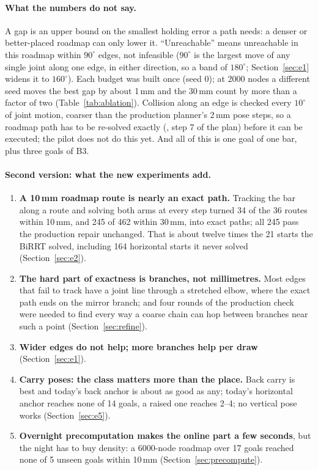 \paragraph{What the numbers do not say.}
A gap is an upper bound on the smallest holding error a path needs: a denser or
better-placed roadmap can only lower it. ``Unreachable'' means unreachable in
this roadmap within $90^\circ$ edges, not infeasible ($90^\circ$ is the
largest move of any single joint along one edge, in either direction, so a
band of $180^\circ$; Section~\ref{sec:e1} widens it to $160^\circ$). Each budget was built once
(seed 0); at 2000 nodes a different seed moves the best gap by about 1\,mm and
the 30\,mm count by more than a factor of two (Table~\ref{tab:ablation}). Collision along an edge is checked every $10^\circ$ of joint motion,
coarser than the production planner's 2\,mm pose steps, so a roadmap path has
to be re-solved exactly (, step 7 of the plan)
before it can be executed; the pilot does not do this yet. And all of this is
one goal of one bar, plus three goals of B3.

\paragraph{Second version: what the new experiments add.}
\begin{enumerate}[nosep,label=(\roman*),resume]
  \item \textbf{A 10\,mm roadmap route is nearly an exact path.} Tracking the bar
        along a route and solving both arms at every step turned 34 of the 36 routes
        within 10\,mm, and 245 of 462 within 30\,mm, into exact paths; all 245 pass
        the production repair unchanged. That is about twelve times the 21 starts the BiRRT
        solved, including 164 horizontal starts it never solved (Section~\ref{sec:e2}).
  \item \textbf{The hard part of exactness is branches, not millimetres.} Most
        edges that fail to track have a joint line through a stretched elbow, where
        the exact path ends on the mirror branch; and four rounds of the production
        check were needed to find every way a coarse chain can hop between branches
        near such a point (Section~\ref{sec:refine}).
  \item \textbf{Wider edges do not help; more branches help per draw}
        (Section~\ref{sec:e1}).
  \item \textbf{Carry poses: the class matters more than the place.} Back carry is
        best and today's back anchor is about as good as any; today's horizontal
        anchor reaches none of 14 goals, a raised one reaches 2--4; no vertical pose
        works (Section~\ref{sec:e5}).
  \item \textbf{Overnight precomputation makes the online part a few seconds}, but
        the night has to buy density: a 6000-node roadmap over 17 goals reached none
        of 5 unseen goals within 10\,mm (Section~\ref{sec:precompute}).
\end{enumerate}


